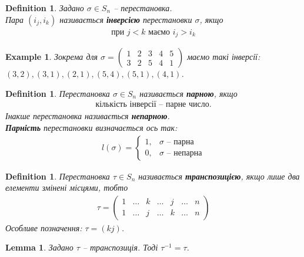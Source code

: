 \documentclass[a4paper, 10pt]{article}
\theoremstyle{theoremdd}
\theoremstyle{theoremdd}
\newtheorem{definition}[theorem]{Definition}
\theoremstyle{theoremdd}
\theoremstyle{theoremdd}
\theoremstyle{theoremdd}
\newtheorem{example}[theorem]{Example}
\theoremstyle{theoremdd}
\theoremstyle{theoremdd}
\theoremstyle{theoremdd}
\theoremstyle{theoremdd}
\theoremstyle{theoremdd}
\theoremstyle{theoremdd}
\theoremstyle{theoremdd}
\theoremstyle{theoremdd}
\newtheorem{lemma}[theorem]{Lemma}
\theoremstyle{theoremdd}
\theoremstyle{theoremdd}
\begin{document}
\begin{definition}
Задано $\sigma \in S_n$ -- перестановка.\\
Пара $(i_j,i_k)$ називається \textbf{інверсією} перестановки $\sigma$, якщо 
\begin{align*}
\text{при } j < k \text{ маємо  } i_j > i_k
\end{align*}
\end{definition}

\begin{example}
Зокрема для $\sigma = \begin{pmatrix}
1 & 2 & 3 & 4 & 5\\
3 & 2 & 5 & 4 & 1
\end{pmatrix}$ маємо такі інверсії: $(3,2), (3,1), (2,1), (5,4), (5,1), (4,1)$.
\end{example}

\begin{definition}
Перестановка $\sigma \in S_n$ називається \textbf{парною}, якщо
\begin{align*}
\text{кількість інверсії -- парне число.}
\end{align*}
Інакше перестановка називається \textbf{непарною}.\\
\textbf{Парність} перестановки визначається ось так:
\begin{align*}
l(\sigma) = \begin{cases} 1, & \sigma \text{ -- парна}\\ 0, & \sigma \text{ -- непарна} \end{cases}
\end{align*}
\end{definition}

\begin{definition}
Перестановка $\tau \in S_n$ називається \textbf{транспозицією}, якщо лише два елементи змінені місцями, тобто
\begin{align*}
\tau = \begin{pmatrix}
1 & \dots & k & \dots & j & \dots & n \\
1 & \dots & j & \dots & k & \dots & n
\end{pmatrix}
\end{align*}
Особливе позначення: $\tau = (kj)$.
\end{definition}

\begin{lemma}
Задано $\tau$ -- транспозиція. Тоді $\tau^{-1} = \tau$.
\end{lemma}
\end{document}
